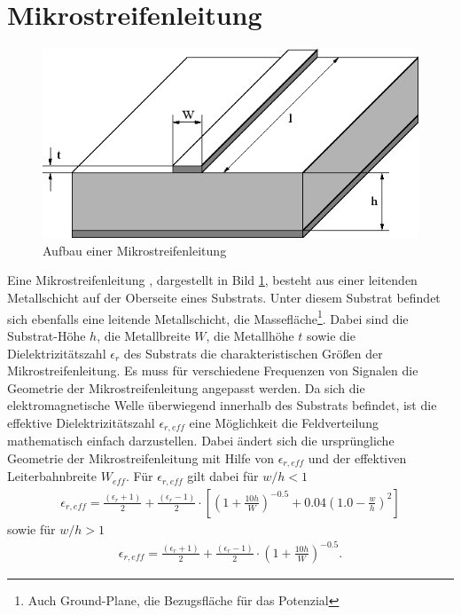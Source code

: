 \section{Mikrostreifenleitung}
\begin{figure}[tp]
  \centering
  \includegraphics[scale=0.5]{gfx/MSL.png}
  \caption{Aufbau einer Mikrostreifenleitung\cite{MSL}}
  \label{fig:MSL}
\end{figure}
Eine Mikrostreifenleitung , dargestellt in Bild \ref{fig:MSL}, besteht aus einer leitenden Metallschicht auf der Oberseite eines Substrats. Unter diesem Substrat befindet sich ebenfalls eine leitende Metallschicht, die Massefläche\footnote{Auch Ground-Plane, die Bezugsfläche für das Potenzial}. Dabei sind die Substrat-Höhe $h$, die Metallbreite $W$, die Metallhöhe $t$ sowie die Dielektrizitätszahl $\epsilon_{r}$ des Substrats die charakteristischen Größen der Mikrostreifenleitung. Es muss für verschiedene Frequenzen von Signalen die Geometrie der Mikrostreifenleitung angepasst werden\cite{TransmissionLineDesignHandbook}. Da sich die elektromagnetische Welle überwiegend innerhalb des Substrats befindet, ist die effektive Dielektrizitätszahl $\epsilon_{r,eff}$ eine Möglichkeit die Feldverteilung mathematisch einfach darzustellen. Dabei ändert sich die ursprüngliche Geometrie der Mikrostreifenleitung mit Hilfe von $\epsilon_{r,eff}$ und der effektiven Leiterbahnbreite $W_{eff}$. Für $\epsilon_{r,eff}$ gilt dabei für $w/h < 1 $
\begin{align}
\epsilon_{r,eff} = \frac{\left( \epsilon_{r}+1 \right)}{2} + \frac{\left( \epsilon_{r}-1 \right)}{2} \cdot \left[ \left( 1 + \frac{10h}{W}\right)^{-0.5}+ 0.04 \left( 1.0 - \frac{w}{h}\right)^2\right]
\end{align}
sowie für $ w/h > 1$
\begin{align}
\epsilon_{r,eff} = \frac{\left( \epsilon_{r}+1 \right)}{2} + \frac{\left( \epsilon_{r}-1 \right)}{2} \cdot \left( 1 + \frac{10h}{W}\right)^{-0.5}.
\end{align}



